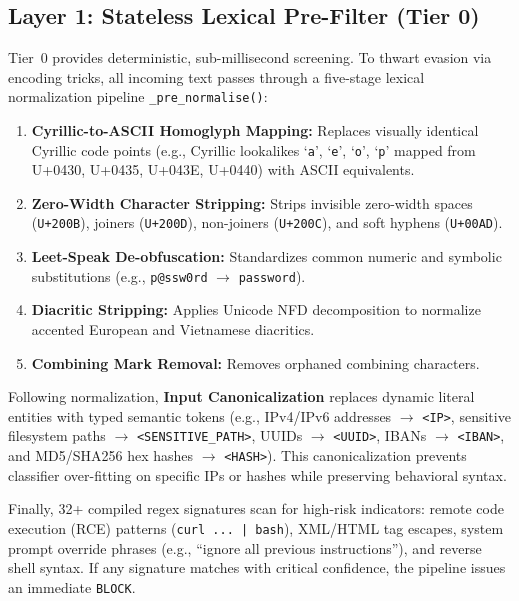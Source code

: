 \documentclass[conference]{IEEEtran}
\begin{document}
\subsection{Layer 1: Stateless Lexical Pre-Filter (Tier 0)}
Tier~0 provides deterministic, sub-millisecond screening. To thwart evasion via encoding tricks, all incoming text passes through a five-stage lexical normalization pipeline \texttt{\_pre\_normalise()}:
\begin{enumerate}[leftmargin=*]
    \item \textbf{Cyrillic-to-ASCII Homoglyph Mapping:} Replaces visually identical Cyrillic code points (e.g., Cyrillic lookalikes `\texttt{a}', `\texttt{e}', `\texttt{o}', `\texttt{p}' mapped from U+0430, U+0435, U+043E, U+0440) with ASCII equivalents.
    \item \textbf{Zero-Width Character Stripping:} Strips invisible zero-width spaces (\texttt{U+200B}), joiners (\texttt{U+200D}), non-joiners (\texttt{U+200C}), and soft hyphens (\texttt{U+00AD}).
    \item \textbf{Leet-Speak De-obfuscation:} Standardizes common numeric and symbolic substitutions (e.g., \texttt{p@ssw0rd} $\to$ \texttt{password}).
    \item \textbf{Diacritic Stripping:} Applies Unicode NFD decomposition to normalize accented European and Vietnamese diacritics.
    \item \textbf{Combining Mark Removal:} Removes orphaned combining characters.
\end{enumerate}

Following normalization, \textbf{Input Canonicalization} replaces dynamic literal entities with typed semantic tokens (e.g., IPv4/IPv6 addresses $\to$ \texttt{<IP>}, sensitive filesystem paths $\to$ \texttt{<SENSITIVE\_PATH>}, UUIDs $\to$ \texttt{<UUID>}, IBANs $\to$ \texttt{<IBAN>}, and MD5/SHA256 hex hashes $\to$ \texttt{<HASH>}). This canonicalization prevents classifier over-fitting on specific IPs or hashes while preserving behavioral syntax.

Finally, 32+ compiled regex signatures scan for high-risk indicators: remote code execution (RCE) patterns (\texttt{curl\ ...\ |\ bash}), XML/HTML tag escapes, system prompt override phrases (e.g., ``ignore all previous instructions''), and reverse shell syntax. If any signature matches with critical confidence, the pipeline issues an immediate \texttt{BLOCK}.
\end{document}
